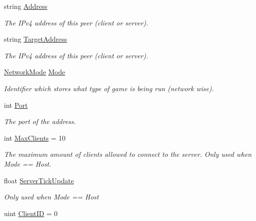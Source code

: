 \begin{DoxyCompactItemize}
\item 
string \hyperlink{class_skyrates_1_1_common_1_1_network_1_1_session_ac6ecaf40c7cae0c6c7d6e8de1b2a892c}{Address}
\begin{DoxyCompactList}\small\item\em The I\-Pv4 address of this peer (client or server). \end{DoxyCompactList}\item 
string \hyperlink{class_skyrates_1_1_common_1_1_network_1_1_session_a6d550a6d31777ca6d1d6dfba00c7955b}{Target\-Address}
\begin{DoxyCompactList}\small\item\em The I\-Pv4 address of this peer (client or server). \end{DoxyCompactList}\item 
\hyperlink{class_skyrates_1_1_common_1_1_network_1_1_session_ad2f4973bc77af540bd68a428e349fbff}{Network\-Mode} \hyperlink{class_skyrates_1_1_common_1_1_network_1_1_session_a659a2e1e5c0bc707eb0e6dcfa17b17a8}{Mode}
\begin{DoxyCompactList}\small\item\em Identifier which stores what type of game is being run (network wise). \end{DoxyCompactList}\item 
int \hyperlink{class_skyrates_1_1_common_1_1_network_1_1_session_aed90ad75336095fa3287c961aba40c7b}{Port}
\begin{DoxyCompactList}\small\item\em The port of the address. \end{DoxyCompactList}\item 
int \hyperlink{class_skyrates_1_1_common_1_1_network_1_1_session_a4d9934f0f98f603daf947afacf49d3fb}{Max\-Clients} = 10
\begin{DoxyCompactList}\small\item\em The maximum amount of clients allowed to connect to the server. Only used when Mode == Host. \end{DoxyCompactList}\item 
float \hyperlink{class_skyrates_1_1_common_1_1_network_1_1_session_aa5dc95f5f695af9aa5c0a170036a46b3}{Server\-Tick\-Update}
\begin{DoxyCompactList}\small\item\em Only used when Mode == Host \end{DoxyCompactList}\item 
uint \hyperlink{class_skyrates_1_1_common_1_1_network_1_1_session_aac06adc8a6108e66ce1c465f60d9f95e}{Client\-I\-D} = 0

\end{DoxyCompactItemize}
